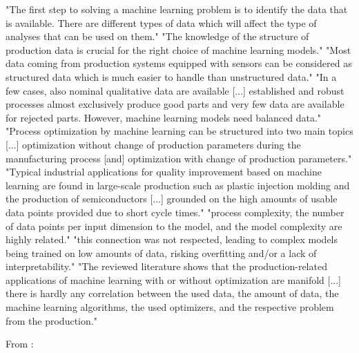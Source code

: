 "The first step to solving a machine learning problem is to identify the data that is available. There are different types of data which will affect the type of analyses that can be used on them."
"The knowledge of the structure of production data is crucial for the right choice of machine learning models."
"Most data coming from production systems equipped with sensors can be considered as structured data which is much easier to handle than unstructured data."
"In a few cases, also nominal qualitative data are available [...] established and robust processes almost exclusively produce good parts and very few data are available for rejected parts. However, machine learning models need balanced data."
"Process optimization by machine learning can be structured into two main topics [...] optimization without change of production parameters during the manufacturing process [and] optimization with change of production parameters."
"Typical industrial applications for quality improvement based on machine learning are found in large-scale production such as plastic injection molding and the production of semiconductors [...] grounded on the high amounts of usable data points provided due to short cycle times."
"process complexity, the number of data points per input dimension to the model, and the model complexity are highly related."
"this connection was not respected, leading to complex models being trained on low amounts of data, risking overfitting and/or a lack of interpretability."
"The reviewed literature shows that the production-related applications of machine learning with or without optimization are manifold [...] there is hardly any correlation between the used data, the amount of data, the machine learning algorithms, the used optimizers, and the respective problem from the production."

From \parencite{plathottam2023review_ai_manufacturing} :

